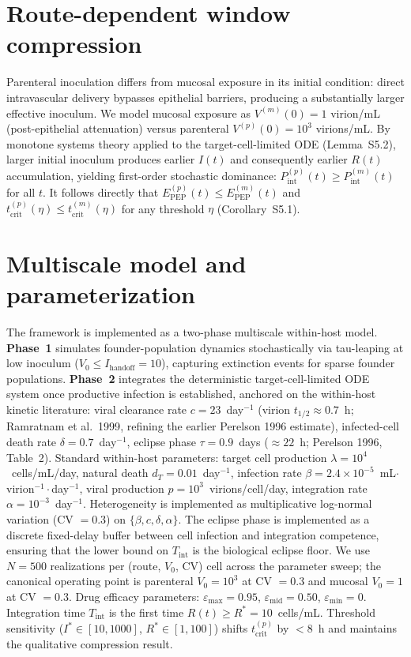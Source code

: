 \documentclass[11pt]{article}
\theoremstyle{definition}
\theoremstyle{remark}
\newcommand{\Tint}{T_{\text{int}}}
\newcommand{\Pint}{P_{\text{int}}}
\newcommand{\Epep}{E_{\text{PEP}}}
\newcommand{\tcrit}{t_{\text{crit}}}
\newcommand{\emax}{\varepsilon_{\max}}
\newcommand{\emid}{\varepsilon_{\text{mid}}}
\newcommand{\emin}{\varepsilon_{\min}}
\begin{document}
\section*{Route-dependent window compression}

Parenteral inoculation differs from mucosal exposure in its initial condition: direct intravascular delivery bypasses epithelial barriers, producing a substantially larger effective inoculum. We model mucosal exposure as $V^{(m)}(0) = 1$ virion/mL (post-epithelial attenuation) versus parenteral $V^{(p)}(0) = 10^{3}$ virions/mL. By monotone systems theory applied to the target-cell-limited ODE (Lemma~S5.2), larger initial inoculum produces earlier $I(t)$ and consequently earlier $R(t)$ accumulation, yielding first-order stochastic dominance: $\Pint^{(p)}(t) \geq \Pint^{(m)}(t)$ for all $t$. It follows directly that $\Epep^{(p)}(t) \leq \Epep^{(m)}(t)$ and $\tcrit^{(p)}(\eta) \leq \tcrit^{(m)}(\eta)$ for any threshold $\eta$ (Corollary~S5.1).

\section*{Multiscale model and parameterization}

The framework is implemented as a two-phase multiscale within-host model. \textbf{Phase~1} simulates founder-population dynamics stochastically via tau-leaping at low inoculum ($V_{0} \leq I_{\text{handoff}} = 10$), capturing extinction events for sparse founder populations. \textbf{Phase~2} integrates the deterministic target-cell-limited ODE system once productive infection is established, anchored on the within-host kinetic literature: viral clearance rate $c = 23$~day$^{-1}$ (virion $t_{1/2} \approx 0.7$~h; Ramratnam et al.\ 1999\cite{ramratnam1999}, refining the earlier Perelson 1996\cite{perelson1996} estimate), infected-cell death rate $\delta = 0.7$~day$^{-1}$\cite{perelson1996}, eclipse phase $\tau = 0.9$~days ($\approx 22$~h; Perelson 1996, Table~2). Standard within-host parameters\cite{mcmichael2010}: target cell production $\lambda = 10^{4}$~cells/mL/day, natural death $d_{T} = 0.01$~day$^{-1}$, infection rate $\beta = 2.4 \times 10^{-5}$~mL$\cdot$virion$^{-1}\cdot$day$^{-1}$, viral production $p = 10^{3}$~virions/cell/day, integration rate $\alpha = 10^{-3}$~day$^{-1}$. Heterogeneity is implemented as multiplicative log-normal variation (CV $= 0.3$) on $\{\beta, c, \delta, \alpha\}$. The eclipse phase is implemented as a discrete fixed-delay buffer between cell infection and integration competence, ensuring that the lower bound on $\Tint$ is the biological eclipse floor. We use $N = 500$ realizations per (route, $V_{0}$, CV) cell across the parameter sweep; the canonical operating point is parenteral $V_{0} = 10^{3}$ at CV $= 0.3$ and mucosal $V_{0} = 1$ at CV $= 0.3$. Drug efficacy parameters: $\emax = 0.95$, $\emid = 0.50$, $\emin = 0$. Integration time $\Tint$ is the first time $R(t) \geq R^{*} = 10$~cells/mL. Threshold sensitivity ($I^{*} \in [10, 1000]$, $R^{*} \in [1, 100]$) shifts $\tcrit^{(p)}$ by $<8$~h and maintains the qualitative compression result.
\end{document}
